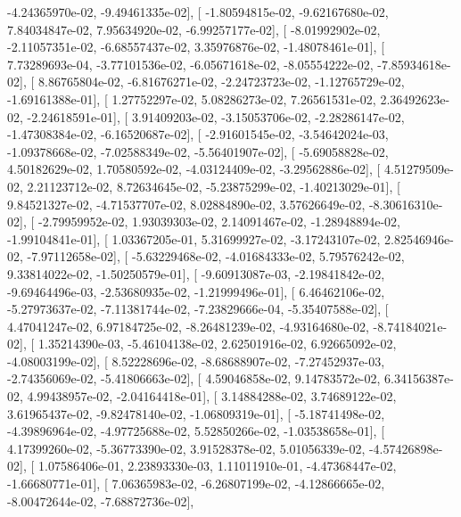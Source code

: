 \documentclass{article}
\begin{document}
         -4.24365970e-02,  -9.49461335e-02],
       [ -1.80594815e-02,  -9.62167680e-02,   7.84034847e-02,
          7.95634920e-02,  -6.99257177e-02],
       [ -8.01992902e-02,  -2.11057351e-02,  -6.68557437e-02,
          3.35976876e-02,  -1.48078461e-01],
       [  7.73289693e-04,  -3.77101536e-02,  -6.05671618e-02,
         -8.05554222e-02,  -7.85934618e-02],
       [  8.86765804e-02,  -6.81676271e-02,  -2.24723723e-02,
         -1.12765729e-02,  -1.69161388e-01],
       [  1.27752297e-02,   5.08286273e-02,   7.26561531e-02,
          2.36492623e-02,  -2.24618591e-01],
       [  3.91409203e-02,  -3.15053706e-02,  -2.28286147e-02,
         -1.47308384e-02,  -6.16520687e-02],
       [ -2.91601545e-02,  -3.54642024e-03,  -1.09378668e-02,
         -7.02588349e-02,  -5.56401907e-02],
       [ -5.69058828e-02,   4.50182629e-02,   1.70580592e-02,
         -4.03124409e-02,  -3.29562886e-02],
       [  4.51279509e-02,   2.21123712e-02,   8.72634645e-02,
         -5.23875299e-02,  -1.40213029e-01],
       [  9.84521327e-02,  -4.71537707e-02,   8.02884890e-02,
          3.57626649e-02,  -8.30616310e-02],
       [ -2.79959952e-02,   1.93039303e-02,   2.14091467e-02,
         -1.28948894e-02,  -1.99104841e-01],
       [  1.03367205e-01,   5.31699927e-02,  -3.17243107e-02,
          2.82546946e-02,  -7.97112658e-02],
       [ -5.63229468e-02,  -4.01684333e-02,   5.79576242e-02,
          9.33814022e-02,  -1.50250579e-01],
       [ -9.60913087e-03,  -2.19841842e-02,  -9.69464496e-03,
         -2.53680935e-02,  -1.21999496e-01],
       [  6.46462106e-02,  -5.27973637e-02,  -7.11381744e-02,
         -7.23829666e-04,  -5.35407588e-02],
       [  4.47041247e-02,   6.97184725e-02,  -8.26481239e-02,
         -4.93164680e-02,  -8.74184021e-02],
       [  1.35214390e-03,  -5.46104138e-02,   2.62501916e-02,
          6.92665092e-02,  -4.08003199e-02],
       [  8.52228696e-02,  -8.68688907e-02,  -7.27452937e-03,
         -2.74356069e-02,  -5.41806663e-02],
       [  4.59046858e-02,   9.14783572e-02,   6.34156387e-02,
          4.99438957e-02,  -2.04164418e-01],
       [  3.14884288e-02,   3.74689122e-02,   3.61965437e-02,
         -9.82478140e-02,  -1.06809319e-01],
       [ -5.18741498e-02,  -4.39896964e-02,  -4.97725688e-02,
          5.52850266e-02,  -1.03538658e-01],
       [  4.17399260e-02,  -5.36773390e-02,   3.91528378e-02,
          5.01056339e-02,  -4.57426898e-02],
       [  1.07586406e-01,   2.23893330e-03,   1.11011910e-01,
         -4.47368447e-02,  -1.66680771e-01],
       [  7.06365983e-02,  -6.26807199e-02,  -4.12866665e-02,
         -8.00472644e-02,  -7.68872736e-02],
\end{document}
